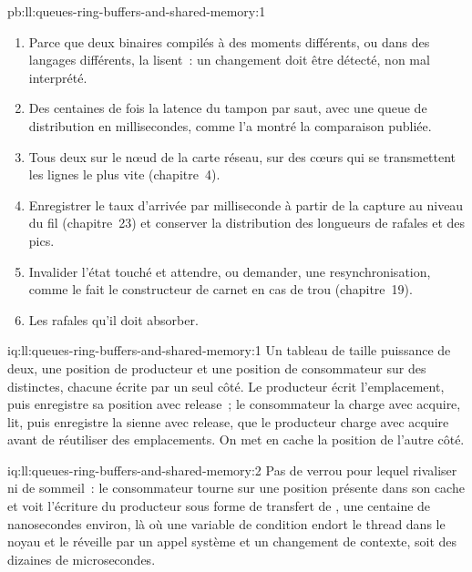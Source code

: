 \begin{solution}{pb:ll:queues-ring-buffers-and-shared-memory:1}
\begin{enumerate}
\item Parce que deux binaires compilés à des moments différents, ou dans des langages différents, la lisent~: un changement doit être détecté, non mal interprété.
\item Des centaines de fois la latence du tampon par saut, avec une queue de distribution en millisecondes, comme l'a montré la comparaison publiée.
\item Tous deux sur le nœud de la carte réseau, sur des cœurs qui se transmettent les lignes le plus vite (chapitre~4).
\item Enregistrer le taux d'arrivée par milliseconde à partir de la capture au niveau du fil (chapitre~23) et conserver la distribution des longueurs de rafales
et des pics.
\item Invalider l'état touché et attendre, ou demander, une resynchronisation, comme le fait le constructeur de carnet en cas de trou (chapitre~19).
\item Les rafales qu'il doit absorber.
\end{enumerate}
\end{solution}

\begin{solution}{iq:ll:queues-ring-buffers-and-shared-memory:1}
Un tableau de taille puissance de deux, une position de producteur et une position de consommateur sur des  distinctes, chacune écrite par un seul côté. Le producteur
écrit l'emplacement, puis enregistre sa position avec release~; le consommateur la charge avec acquire, lit, puis enregistre la sienne avec release,
que le producteur charge avec acquire avant de réutiliser des emplacements. On met en cache la position de l'autre côté.
\end{solution}

\begin{solution}{iq:ll:queues-ring-buffers-and-shared-memory:2}
Pas de verrou pour lequel rivaliser ni de sommeil~: le consommateur tourne sur une position présente dans son cache et voit l'écriture du producteur sous forme de
transfert de , une centaine de nanosecondes environ, là où une variable de condition endort le thread dans le noyau et le réveille par
un appel système et un changement de contexte, soit des dizaines de microsecondes.
\end{solution}

